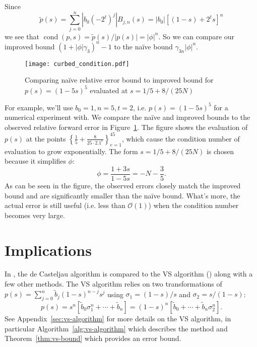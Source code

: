 \documentclass[letterpaper,10pt]{article}
\theoremstyle{definition}
\newcommand{\cond}[1]{\operatorname{cond}\left(#1\right)}
\newcommand{\bigO}[1]{\mathcal{O}\left(#1\right)}
\begin{document}
Since
\begin{equation}
\widetilde{p}(s) = \sum_{j = 0}^n \left|b_0 \left(-2^t\right)^j\right|
  B_{j, n}(s) = \left|b_0\right| \left[(1 - s) + 2^t s\right]^n
\end{equation}
we see that \(\cond{p, s} = \widetilde{p}(s) / \left|p(s)\right| =
\left|\phi\right|^n\). So we can compare our improved bound
\(\left(1 + \left|\phi\right| \gamma_3\right)^n - 1\)
to the na\"ive bound \(\gamma_{3n} \left|\phi\right|^n\).

\begin{figure}
  \texttt{[image: curbed\_condition.pdf]}
  \centering
  \captionsetup{width=.75\linewidth}
  \caption{Comparing na\"ive relative error bound to improved bound for
    \(p(s) = (1 - 5s)^{5}\) evaluated at \(s = 1/5 + 8/(25N)\)}
  \label{fig:curbed-condition}
\end{figure}

For example, we'll use \(b_0 = 1, n = 5, t = 2\), i.e. \(p(s) = (1 - 5s)^5\)
for a numerical experiment with. We compare the na\"ive and improved bounds to
the observed relative forward error in Figure~\ref{fig:curbed-condition}.
The figure shows the evaluation of \(p(s)\) at the points
\(\left\{\frac{1}{5} + \frac{8}{25 \cdot 2.1^e}\right\}_{e = 1}^{45}\),
which cause the condition number of evaluation to grow exponentially.
The form \(s = 1/5 + 8/(25N)\) is chosen because it simplifies
\(\phi\):
\begin{equation}
\phi = \frac{1 + 3s}{1 - 5s} = -N - \frac{3}{5}.
\end{equation}
As can be seen in the figure, the observed errors closely match the
improved bound and are significantly smaller than
the na\"ive bound. What's more, the actual error is still useful
(i.e. less than \(\bigO{1}\)) when the condition number becomes
very large.

\section{Implications}\label{sec:implications}

In \cite{Delgado2015}, the de Casteljau algorithm is compared to the VS
algorithm (\cite{Schumaker1986}) along with a few other methods. The VS
algorithm relies on two transformations of \(p(s) =
\sum_{j = 0}^n \widetilde{b}_j (1 - s)^{n - j} s^j\) using
\(\sigma_1 = (1 - s) / s\) and \(\sigma_2 = s / (1 - s)\):
\begin{equation}\label{vs-transform}
p(s) = s^n \left[\widetilde{b}_0 \sigma_1^n + \cdots + \widetilde{b}_n\right]
= (1 - s)^n \left[\widetilde{b}_0 + \cdots + \widetilde{b}_n \sigma_2^n\right].
\end{equation}
See Appendix~\ref{sec:vs-algorithm} for more details on the VS algorithm,
in particular Algorithm~\ref{alg:vs-algorithm} which describes the method and
Theorem~\ref{thm:vs-bound} which provides an error bound.
\end{document}
